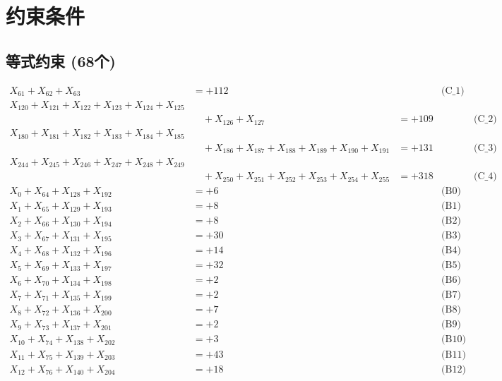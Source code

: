 \documentclass[a4paper,10pt]{article}
\begin{document}
\section{约束条件}

\subsection{等式约束 (68个)}

\allowdisplaybreaks
{\small
\begin{align}
X_{61} + X_{62} + X_{63} &= +112 && \text{(C\_1)} \\
X_{120} + X_{121} + X_{122} + X_{123} + X_{124} + X_{125} \\[0.1ex]
&\quad  + X_{126} + X_{127} &= +109 && \text{(C\_2)} \\
X_{180} + X_{181} + X_{182} + X_{183} + X_{184} + X_{185} \\[0.1ex]
&\quad  + X_{186} + X_{187} + X_{188} + X_{189} + X_{190} + X_{191} &= +131 && \text{(C\_3)} \\
X_{244} + X_{245} + X_{246} + X_{247} + X_{248} + X_{249} \\[0.1ex]
&\quad  + X_{250} + X_{251} + X_{252} + X_{253} + X_{254} + X_{255} &= +318 && \text{(C\_4)} \\
X_{0} + X_{64} + X_{128} + X_{192} &= +6 && \text{(B0)} \\
\allowbreak
X_{1} + X_{65} + X_{129} + X_{193} &= +8 && \text{(B1)} \\
X_{2} + X_{66} + X_{130} + X_{194} &= +8 && \text{(B2)} \\
X_{3} + X_{67} + X_{131} + X_{195} &= +30 && \text{(B3)} \\
X_{4} + X_{68} + X_{132} + X_{196} &= +14 && \text{(B4)} \\
X_{5} + X_{69} + X_{133} + X_{197} &= +32 && \text{(B5)} \\
\allowbreak
X_{6} + X_{70} + X_{134} + X_{198} &= +2 && \text{(B6)} \\
X_{7} + X_{71} + X_{135} + X_{199} &= +2 && \text{(B7)} \\
X_{8} + X_{72} + X_{136} + X_{200} &= +7 && \text{(B8)} \\
X_{9} + X_{73} + X_{137} + X_{201} &= +2 && \text{(B9)} \\
X_{10} + X_{74} + X_{138} + X_{202} &= +3 && \text{(B10)} \\
\allowbreak
X_{11} + X_{75} + X_{139} + X_{203} &= +43 && \text{(B11)} \\
X_{12} + X_{76} + X_{140} + X_{204} &= +18 && \text{(B12)} \\

\end{align}}
\end{document}
